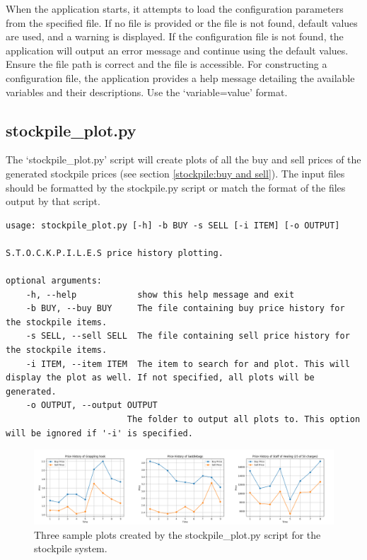 When the application starts, it attempts to load the configuration parameters from the specified file. If no file is provided or the file is not found, default values are used, and a warning is displayed. If the configuration file is not found, the application will output an error message and continue using the default values. Ensure the file path is correct and the file is accessible. For constructing a configuration file, the application provides a help message detailing the available variables and their descriptions. Use the `variable=value' format.









\subsection{stockpile\_plot.py}

The `stockpile\_plot.py' script will create plots of all the buy and sell prices of the generated stockpile prices (see section \ref{stockpile:buy and sell}). The input files should be formatted by the stockpile.py script or match the format of the files output by that script.

\begin{lstlisting}
usage: stockpile_plot.py [-h] -b BUY -s SELL [-i ITEM] [-o OUTPUT]

S.T.O.C.K.P.I.L.E.S price history plotting.

optional arguments:
	-h, --help            show this help message and exit
	-b BUY, --buy BUY     The file containing buy price history for the stockpile items.
	-s SELL, --sell SELL  The file containing sell price history for the stockpile items.
	-i ITEM, --item ITEM  The item to search for and plot. This will display the plot as well. If not specified, all plots will be generated.
	-o OUTPUT, --output OUTPUT
	                    The folder to output all plots to. This option will be ignored if '-i' is specified.
\end{lstlisting}


\begin{figure}[h]
	\centering
	\includegraphics[width=\textwidth]{images/sample_plots.jpg}
	\caption{Three sample plots created by the stockpile\_plot.py script for the stockpile system.}
	\label{fig:sample_plots}
\end{figure}






